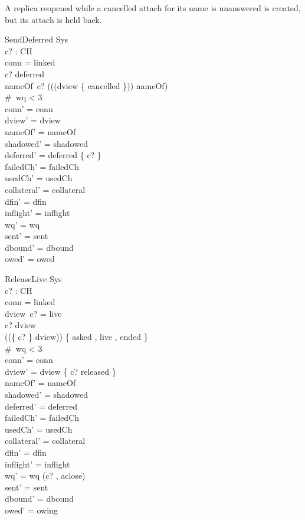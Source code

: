 \documentclass[a4paper,10pt,fleqn]{article}
\begin{document}
A replica reopened while a cancelled attach for its name is unanswered is created, but its attach is held back.

\begin{schema}{SendDeferred}
  \Delta Sys \\
  c? : CH \\
\where
  conn = linked \\
  c? \in deferred \\
  nameOf~c? \notin \ran ((\dom (dview \rres \{ cancelled \})) \dres nameOf) \\
  \#~wq < 3 \\
  conn' = conn \\
  dview' = dview \\
  nameOf' = nameOf \\
  shadowed' = shadowed \\
  deferred' = deferred \setminus \{ c? \} \\
  failedCh' = failedCh \\
  usedCh' = usedCh \\
  collateral' = collateral \\
  dfin' = dfin \\
  inflight' = inflight \\
  wq' = wq \\
  sent' = sent \\
  dbound' = dbound \\
  owed' = owed
\end{schema}

\begin{schema}{ReleaseLive}
  \Delta Sys \\
  c? : CH \\
\where
  conn = linked \\
  dview~c? = live \\
  c? \in \dom dview \\
  (\ran (\{ c? \} \ndres dview)) \cap \{ asked , live , ended \} \neq \emptyset \\
  \#~wq < 3 \\
  conn' = conn \\
  dview' = dview \oplus \{ c? \mapsto released \} \\
  nameOf' = nameOf \\
  shadowed' = shadowed \\
  deferred' = deferred \\
  failedCh' = failedCh \\
  usedCh' = usedCh \\
  collateral' = collateral \\
  dfin' = dfin \\
  inflight' = inflight \\
  wq' = wq \cat \langle (c? , aclose) \rangle \\
  sent' = sent \\
  dbound' = dbound \\
  owed' = owing
\end{schema}
\end{document}
